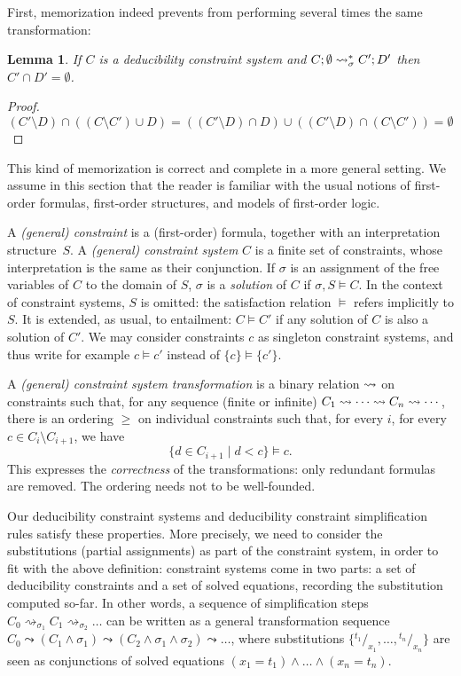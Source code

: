 \documentclass[acmtocl,acmnow]{acmtrans2m}
\newtheorem{lemma}[theorem]{Lemma}
\newcommand{\subst}[2]{{}^{#2}\!/_{\!#1}}
\newcommand{\dedcons}[1]{deducibility constraint}
\newcommand{\dedsys}[1]{deducibility constraint system}
\newcommand{\dedsyss}[1]{deducibility constraint systems}
\begin{document}
First, memorization indeed prevents from performing several times the
same transformation:
\begin{lemma}\label{lemma:disjoint}
If $C$ is a \dedsys{} and
$C;\emptyset\rightsquigarrow^*_{\sigma} C';D'$ then $C'\cap D'=\emptyset$. 
\end{lemma}

\begin{proof}
\[(C'\setminus D) \cap ((C\setminus C') \cup D)= ((C'\setminus D) \cap D )
\cup ((C'\setminus D) \cap (C\setminus C'))=\emptyset
\]
\end{proof}


This kind of memorization is correct and complete in a more general
setting. We assume in this section that the reader is familiar with
the usual notions of first-order formulas, first-order structures, and
models of first-order logic.

A \emph{(general) constraint} is a (first-order) formula, together
with an interpretation structure~$S$. A \emph{(general) constraint system}
$C$ is a finite set of constraints, whose interpretation is the same as
their conjunction. If $\sigma$ is an assignment of the free variables of
$C$ to the domain of $S$, $\sigma$ is a \emph{solution} of $C$ if $\sigma, S \models
C$. In the context of constraint systems, $S$ is omitted: the
satisfaction relation $\models$ refers implicitly to $S$. It is extended,
as usual, to entailment: $C \models C'$ if any solution of $C$ is also a
solution of $C'$.
We may consider constraints $c$ as singleton constraint systems, and
thus write for example $c \models c'$ instead of $\{c\} \models
\{c'\}$.


A \emph{(general) constraint system transformation} is a binary
relation $\leadsto$ on constraints such that, for any sequence (finite
or infinite) $C_1 \leadsto \cdots \leadsto C_n \leadsto \cdots$, there is
an ordering $\geq$ on individual constraints such that, for every $i$,
for every $c\in C_{i}\setminus C_{i+1}$, we have 
\begin{equation}\label{gtransf}
\{d\in C_{i+1} \mid d < c\} \models c.
\end{equation}
This expresses the \emph{correctness} of the
transformations: only redundant formulas are removed. The ordering
needs not to be well-founded.








Our \dedsyss{} and \dedcons{} simplification rules satisfy these
properties.  More precisely, we need to consider the substitutions
(partial assignments) as part of the constraint system, in order to
fit with the above definition: constraint systems come in two parts: a
set of deducibility constraints and a set of solved equations,
recording the substitution computed so-far.
In other words, a sequence of simplification steps
$C_0\rightsquigarrow_{\sigma_1} C_1 \rightsquigarrow_{\sigma_2} \dots$
can be written as a general transformation sequence $C_0 \leadsto (C_1
\wedge \sigma_1) \leadsto (C_2 \wedge \sigma_1 \wedge \sigma_2)
\leadsto \dots$, where substitutions $\{\subst{x_1}{t_1},\dots,
\subst{x_n}{t_n}\}$ are seen as conjunctions of solved equations
$(x_1=t_1)\wedge \dots \wedge (x_n=t_n)$.
\end{document}
